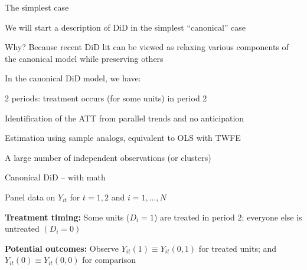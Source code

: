 \documentclass[usenames, dvipsnames, aspectratio = 169, 13pt]{beamer}
\newenvironment{wideitemize}{\itemize\addtolength{\itemsep}{10pt}}{\enditemize}
\begin{document}
\begin{frame}{The simplest case}
\begin{wideitemize}

\item
We will start a description of DiD in the simplest ``canonical'' case

\item
Why? Because recent DiD lit can be viewed as relaxing various components of the canonical model while preserving others
\end{wideitemize}


\pause
In the canonical DiD model, we have:

\medskip 


\begin{wideitemize}
\item
2 periods: treatment occurs (for some units) in period 2

\item
Identification of the ATT from parallel trends and no anticipation

\item
Estimation using sample analogs, equivalent to OLS with TWFE

\item
A large number of independent observations (or clusters)
\end{wideitemize}    
\end{frame}


\begin{frame}{Canonical DiD -- with math}
\begin{wideitemize}
\item
Panel data on $Y_{it}$ for $t=1,2$ and $i = 1,...,N$

\item
\textbf{Treatment timing:} Some units ($D_i=1$) are treated in period $2$; everyone else is untreated $(D_i=0)$

\pause
\item
\textbf{Potential outcomes:} Observe $Y_{it}(1) \equiv Y_{it}(0,1)$ for treated units; and $Y_{it}(0) \equiv Y_{it}(0,0)$ for comparison
\end{wideitemize}    
\end{frame}
\end{document}
